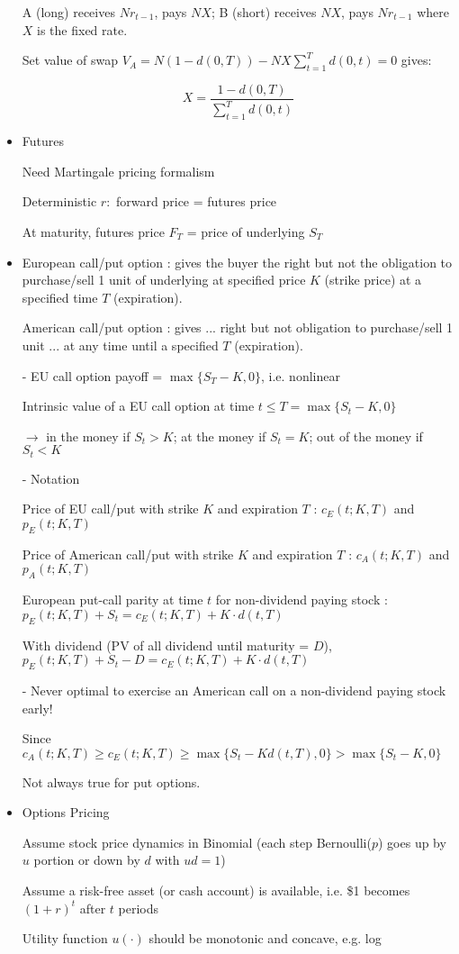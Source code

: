 \documentclass{article}
\begin{document}
\begin{itemize}
A (long) receives $N r_{t-1}$, pays $NX$; B (short) receives $NX$, pays $N r_{t-1}$ where $X$ is the fixed rate.

Set value of swap $V_{A} = N(1 - d(0,T)) - NX \sum\limits_{t=1}^{T} d(0,t) = 0$ gives:

$$X = \frac{1 - d(0,T)}{\sum_{t=1}^{T} d(0,t)}$$


\item Futures

Need Martingale pricing formalism

Deterministic $r:$ forward price = futures price

At maturity, futures price $F_T$ = price of underlying $S_T$

\item {} European call/put option : gives the buyer the right but not the obligation to purchase/sell 1 unit of underlying at specified price $K$ (strike price) at a specified time $T$ (expiration).

 American call/put option : gives ... right but not obligation to purchase/sell 1 unit ... at {\color{red} any time until} a specified $T$ (expiration).

- EU call option payoff = $\max\{S_T - K, 0\}$, i.e. nonlinear

Intrinsic value of a EU call option at time $t \leq T = \max\{S_t - K, 0\}$

$\rightarrow$ in the money if $S_t > K$; at the money if $S_t = K$; out of the money if $S_t < K$

- Notation

Price of EU call/put with strike $K$ and expiration $T$ : $c_E(t; K,T)$ and $p_E(t; K,T)$

Price of American call/put with strike $K$ and expiration $T$ : $c_A(t; K,T)$ and $p_A(t; K,T)$

{\color{red} European put-call parity} at time $t$ for non-dividend paying stock : $p_E(t;K,T) + S_t = c_E(t;K,T) + K \cdot d(t,T)$

With dividend (PV of all dividend until maturity = $D$), $p_E(t; K,T) + S_t - D = c_E(t; K,T) + K \cdot d(t,T)$

- Never optimal to exercise an American call on a non-dividend paying stock early!

Since $c_A(t;K,T) \geq c_E(t;K,T) \geq \max\{S_t - Kd(t,T), 0\} > \max\{S_t - K, 0\}$

Not always true for put options.

\item Options Pricing

Assume stock price dynamics in Binomial (each step Bernoulli($p$) goes up by $u$ portion or down by $d$ with $ud = 1$)

Assume a risk-free asset (or cash account) is available, i.e. \$1 becomes $(1+r)^{t}$ after $t$ periods

Utility function $u(\cdot)$ should be monotonic and concave, e.g. log

\end{itemize}
\end{document}
